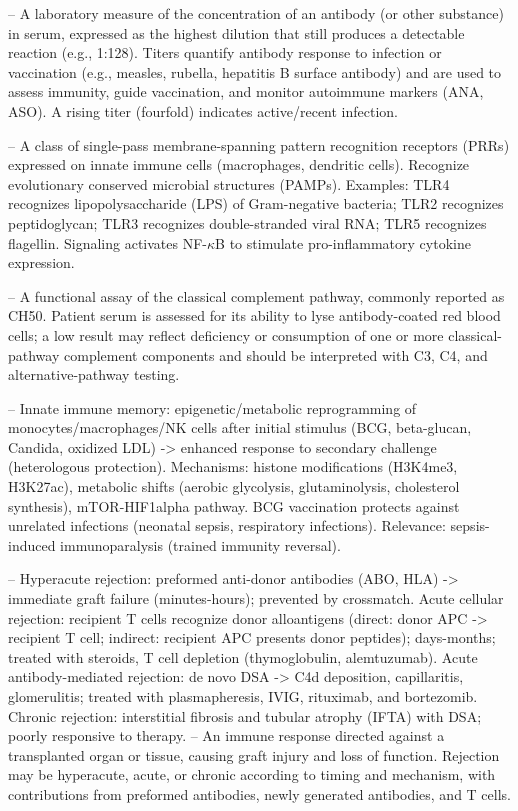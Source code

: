 -- A laboratory measure of the concentration of an antibody (or other substance) in serum, expressed as the highest dilution that still produces a detectable reaction (e.g., 1:128). Titers quantify antibody response to infection or vaccination (e.g., measles, rubella, hepatitis B surface antibody) and are used to assess immunity, guide vaccination, and monitor autoimmune markers (ANA, ASO). A rising titer (fourfold) indicates active/recent infection.

-- A class of single-pass membrane-spanning pattern recognition receptors (PRRs) expressed on innate immune cells (macrophages, dendritic cells). Recognize evolutionary conserved microbial structures (PAMPs). Examples: TLR4 recognizes lipopolysaccharide (LPS) of Gram-negative bacteria; TLR2 recognizes peptidoglycan; TLR3 recognizes double-stranded viral RNA; TLR5 recognizes flagellin. Signaling activates NF-$\kappa$B to stimulate pro-inflammatory cytokine expression.

-- A functional assay of the classical complement pathway, commonly reported as CH50. Patient serum is assessed for its ability to lyse antibody-coated red blood cells; a low result may reflect deficiency or consumption of one or more classical-pathway complement components and should be interpreted with C3, C4, and alternative-pathway testing.

-- Innate immune memory: epigenetic/metabolic reprogramming of monocytes/macrophages/NK cells after initial stimulus (BCG, beta-glucan, Candida, oxidized LDL) -> enhanced response to secondary challenge (heterologous protection). Mechanisms: histone modifications (H3K4me3, H3K27ac), metabolic shifts (aerobic glycolysis, glutaminolysis, cholesterol synthesis), mTOR-HIF1alpha pathway. BCG vaccination protects against unrelated infections (neonatal sepsis, respiratory infections). Relevance: sepsis-induced immunoparalysis (trained immunity reversal).

-- Hyperacute rejection: preformed anti-donor antibodies (ABO, HLA) -> immediate graft failure (minutes-hours); prevented by crossmatch. Acute cellular rejection: recipient T cells recognize donor alloantigens (direct: donor APC -> recipient T cell; indirect: recipient APC presents donor peptides); days-months; treated with steroids, T cell depletion (thymoglobulin, alemtuzumab). Acute antibody-mediated rejection: de novo DSA -> C4d deposition, capillaritis, glomerulitis; treated with plasmapheresis, IVIG, rituximab, and bortezomib. Chronic rejection: interstitial fibrosis and tubular atrophy (IFTA) with DSA; poorly responsive to therapy.
-- An immune response directed against a transplanted organ or tissue, causing graft injury and loss of function. Rejection may be hyperacute, acute, or chronic according to timing and mechanism, with contributions from preformed antibodies, newly generated antibodies, and T cells.

